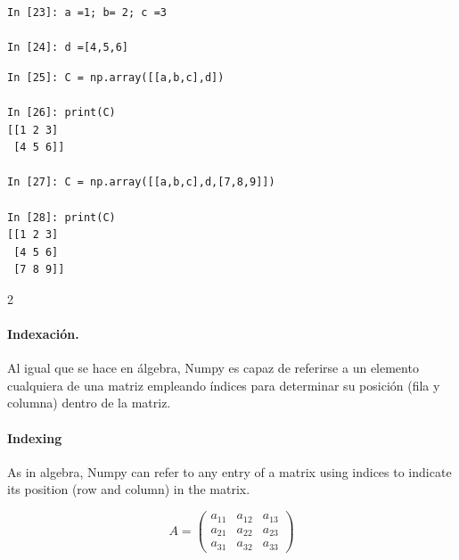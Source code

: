 \begin{center}
    \begin{minipage}{0.4\textwidth}
        \begin{verbatim}
In [23]: a =1; b= 2; c =3

In [24]: d =[4,5,6]

        \end{verbatim}
\end{minipage}
\end{center}
\begin{center}
\begin{minipage}{0.4\textwidth}
\begin{verbatim}
In [25]: C = np.array([[a,b,c],d])

In [26]: print(C)
[[1 2 3]
 [4 5 6]]

In [27]: C = np.array([[a,b,c],d,[7,8,9]])

In [28]: print(C)
[[1 2 3]
 [4 5 6]
 [7 8 9]]
        \end{verbatim}
    \end{minipage}
\end{center}
\begin{paracol}{2}
\paragraph*{Indexación.} Al igual que se hace en álgebra, Numpy es capaz de referirse a un elemento cualquiera de una matriz empleando índices para determinar su posición (fila y columna) dentro de la matriz.
\switchcolumn
\paragraph{Indexing} As in algebra, Numpy can refer to any entry of a matrix using indices to indicate its position (row and column) in the matrix. 
\end{paracol}
\begin{equation*}
A=
\begin{pmatrix}
a_{11}&a_{12}&a_{13}\\
a_{21}&a_{22}&a_{23}\\
a_{31}&a_{32}&a_{33}
\end{pmatrix}
\end{equation*}

